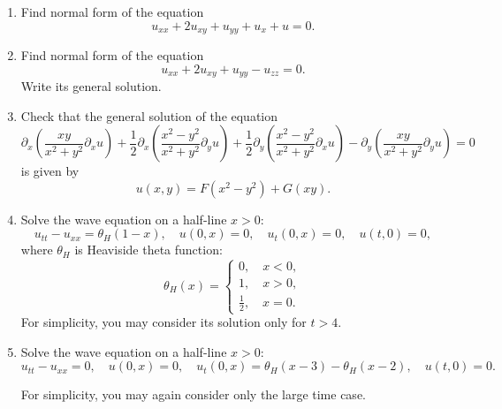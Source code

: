 \documentclass[a4paper,11pt]{article}
\title{}
\author{}
\date{}
\begin{document}

\begin{enumerate}
\item\label{item:1} Find normal form of the equation \[u_{xx}+2 u_{xy}+u_{yy}+u_x+u=0.\]

\item\label{item:2} Find normal form of the equation \[u_{xx}+2u_{xy}+u_{yy}-u_{zz}=0.\] Write its general solution.

\item\label{item:3} Check that the general solution of the equation \[\partial_x \left(\frac{x y}{x^2+y^2}\partial_x u\right)+\frac12 \partial_x \left(\frac{x^2-y^2}{x^2+y^2}\partial_y u\right)+\frac12 \partial_y \left(\frac{x^2-y^2}{x^2+y^2}\partial_x u\right) - \partial_y\left(\frac{x y}{x^2+y^2}\partial_y u\right)=0\]
is given by
\[u(x,y)=F(x^2-y^2)+G(x y).\]

\item\label{item:4} Solve the wave equation on a half-line \(x>0\):
\[u_{tt}-u_{xx}=\theta_H(1-x), \quad u(0,x)=0, \quad u_t(0,x)=0, \quad u(t,0)=0,\]
where
\(\theta_H\) is Heaviside theta function:
\[\theta_H(x)=\left\{
\begin{array}{l}0, \quad x<0,\\
1, \quad x>0,\\
\frac12, \quad x=0.
\end{array}
\right.
\]
For simplicity, you may consider its solution only for \(t>4\).

\item\label{item:5} Solve the wave equation on a half-line \(x>0\):
\[
u_{tt}-u_{xx}=0, \quad u(0,x)=0, \quad u_t(0,x)=\theta_H(x-3)-\theta_H(x-2), \quad u(t,0)=0.
\]

For simplicity, you may again consider only the large time case.

\end{enumerate}
\end{document}
